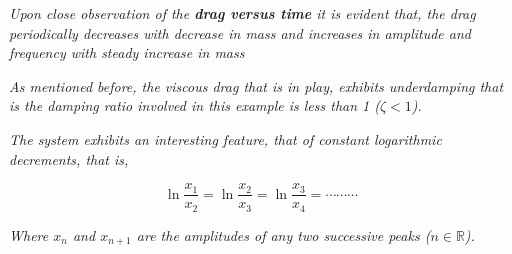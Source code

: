 \textit{Upon close observation of the \textbf{drag versus time} it is evident that, the drag periodically decreases with decrease in mass and increases in amplitude and frequency with steady increase in mass}

\textit{As mentioned before, the viscous drag that is in play, exhibits underdamping that is the damping ratio involved in this example is less than 1 ($\zeta < 1$).}

\textit{The system exhibits an interesting feature, that of constant logarithmic decrements, that is,}
        
    $$\ln{\frac{x_1}{x_2}} = \ln{\frac{x_2}{x_3}} = \ln{\frac{x_3}{x_4}} = \cdots\cdots\cdots$$
        
\textit{Where $x_n$ and $x_{n + 1}$ are the amplitudes of any two successive peaks ($n \in \mathbb{R}$).}
        


